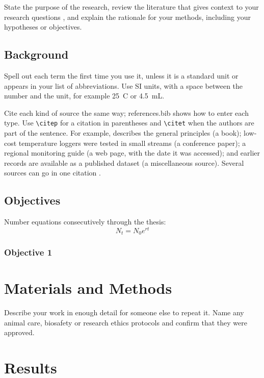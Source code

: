 \documentclass{upei-fos-thesis}
\begin{document}
State the purpose of the research, review the literature that gives context to your
research questions \citep{smith2020}, and explain the rationale for your methods,
including your hypotheses or objectives.

\section{Background}

Spell out each term the first time you use it, unless it is a standard unit or
appears in your list of abbreviations. Use SI units, with a space between the number
and the unit, for example 25~\textdegree C or 4.5~mL.

Cite each kind of source the same way; references.bib shows how to enter each type.
Use \verb|\citep| for a citation in parentheses and \verb|\citet| when the authors
are part of the sentence. For example, \citet{jones2019} describes the general
principles (a book); low-cost temperature loggers were tested in small streams
\citep{arsenault2022} (a conference paper); a regional monitoring guide
\citep{ecoatlantic2025} (a web page, with the date it was accessed); and earlier
records are available as a published dataset \citep{lee2024data} (a miscellaneous
source). Several sources can go in one citation
\citep[e.g.][]{smith2020, arsenault2022}.

\section{Objectives}

Number equations consecutively through the thesis:
\begin{equation}
  N_t = N_0 e^{rt}
  \label{eq:growth}
\end{equation}

\subsection{Objective 1}

\chapter{Materials and Methods}

Describe your work in enough detail for someone else to repeat it. Name any animal
care, biosafety or research ethics protocols and confirm that they were approved.

\chapter{Results}
\end{document}
